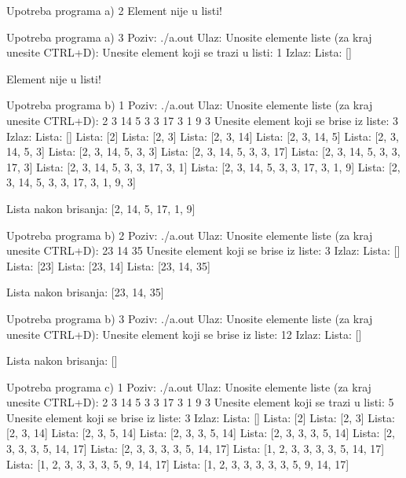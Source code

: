 \begin{Exercise}[label=601]
\begin{maxitest}
\begin{test}{Upotreba programa a) 2}
  Element nije u listi!
\end{test}
\end{maxitest}
\begin{maxitest}
\begin{test}{Upotreba programa a) 3}
Poziv: ./a.out
Ulaz:
  Unosite elemente liste (za kraj unesite CTRL+D): 
  Unesite element koji se trazi u listi: 1
Izlaz:
  Lista: []
  
  Element nije u listi!
\end{test}
\end{maxitest}
\begin{maxitest}
\begin{test}{Upotreba programa b) 1}
Poziv: ./a.out
Ulaz:
  Unosite elemente liste (za kraj unesite CTRL+D): 2 3 14 5 3 3 17 3 1 9 3
  Unesite element koji se brise iz liste: 3
Izlaz:
  Lista: []
  Lista: [2]
  Lista: [2, 3]
  Lista: [2, 3, 14]
  Lista: [2, 3, 14, 5]
  Lista: [2, 3, 14, 5, 3]
  Lista: [2, 3, 14, 5, 3, 3]
  Lista: [2, 3, 14, 5, 3, 3, 17]
  Lista: [2, 3, 14, 5, 3, 3, 17, 3]
  Lista: [2, 3, 14, 5, 3, 3, 17, 3, 1]
  Lista: [2, 3, 14, 5, 3, 3, 17, 3, 1, 9]
  Lista: [2, 3, 14, 5, 3, 3, 17, 3, 1, 9, 3]
  
  Lista nakon brisanja:  [2, 14, 5, 17, 1, 9]
\end{test}
\end{maxitest}
\begin{maxitest}
\begin{test}{Upotreba programa b) 2}
Poziv: ./a.out
Ulaz:
  Unosite elemente liste (za kraj unesite CTRL+D): 23 14 35
  Unesite element koji se brise iz liste: 3
Izlaz:
  Lista: []
  Lista: [23]
  Lista: [23, 14]
  Lista: [23, 14, 35]

  Lista nakon brisanja:  [23, 14, 35]
\end{test}
\end{maxitest}
\begin{maxitest}
\begin{test}{Upotreba programa b) 3}
Poziv: ./a.out
Ulaz:
  Unosite elemente liste (za kraj unesite CTRL+D): 
  Unesite element koji se brise iz liste: 12
Izlaz:
  Lista: []
  
  Lista nakon brisanja:  []
\end{test}
\end{maxitest}
\begin{maxitest}
\begin{test}{Upotreba programa c) 1}
Poziv: ./a.out
Ulaz:
  Unosite elemente liste (za kraj unesite CTRL+D): 2 3 14 5 3 3 17 3 1 9 3
  Unesite element koji se trazi u listi: 5
  Unesite element koji se brise iz liste: 3
Izlaz:
  Lista: []
  Lista: [2]
  Lista: [2, 3]
  Lista: [2, 3, 14]
  Lista: [2, 3, 5, 14]
  Lista: [2, 3, 3, 5, 14]
  Lista: [2, 3, 3, 3, 5, 14]
  Lista: [2, 3, 3, 3, 5, 14, 17]
  Lista: [2, 3, 3, 3, 3, 5, 14, 17]
  Lista: [1, 2, 3, 3, 3, 3, 5, 14, 17]
  Lista: [1, 2, 3, 3, 3, 3, 5, 9, 14, 17]
  Lista: [1, 2, 3, 3, 3, 3, 3, 5, 9, 14, 17]
  

\end{test}
\end{maxitest}
\end{Exercise}
